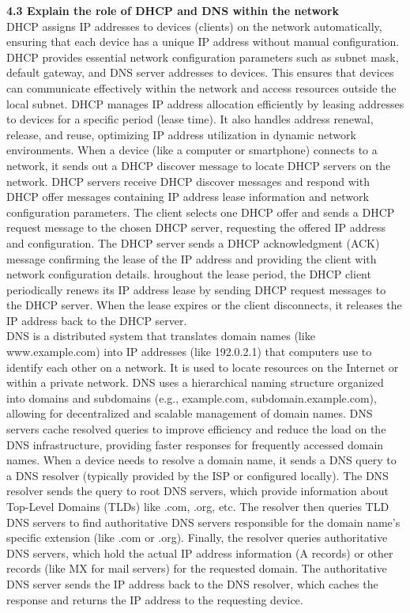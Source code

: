 \documentclass{article}
\begin{document}
\noindent\textbf{4.3 Explain the role of DHCP and DNS within the network}\\

	DHCP assigns IP addresses to devices (clients) on the network automatically, ensuring that each device has a unique IP address without manual configuration. DHCP provides essential network configuration parameters such as subnet mask, default gateway, and DNS server addresses to devices. This ensures that devices can communicate effectively within the network and access resources outside the local subnet. DHCP manages IP address allocation efficiently by leasing addresses to devices for a specific period (lease time). It also handles address renewal, release, and reuse, optimizing IP address utilization in dynamic network environments. When a device (like a computer or smartphone) connects to a network, it sends out a DHCP discover message to locate DHCP servers on the network. DHCP servers receive DHCP discover messages and respond with DHCP offer messages containing IP address lease information and network configuration parameters. The client selects one DHCP offer and sends a DHCP request message to the chosen DHCP server, requesting the offered IP address and configuration. The DHCP server sends a DHCP acknowledgment (ACK) message confirming the lease of the IP address and providing the client with network configuration details. hroughout the lease period, the DHCP client periodically renews its IP address lease by sending DHCP request messages to the DHCP server. When the lease expires or the client disconnects, it releases the IP address back to the DHCP server.\\

	DNS is a distributed system that translates domain names (like www.example.com) into IP addresses (like 192.0.2.1) that computers use to identify each other on a network. It is used to locate resources on the Internet or within a private network. DNS uses a hierarchical naming structure organized into domains and subdomains (e.g., example.com, subdomain.example.com), allowing for decentralized and scalable management of domain names. DNS servers cache resolved queries to improve efficiency and reduce the load on the DNS infrastructure, providing faster responses for frequently accessed domain names. When a device needs to resolve a domain name, it sends a DNS query to a DNS resolver (typically provided by the ISP or configured locally). The DNS resolver sends the query to root DNS servers, which provide information about Top-Level Domains (TLDs) like .com, .org, etc. The resolver then queries TLD DNS servers to find authoritative DNS servers responsible for the domain name's specific extension (like .com or .org). Finally, the resolver queries authoritative DNS servers, which hold the actual IP address information (A records) or other records (like MX for mail servers) for the requested domain. The authoritative DNS server sends the IP address back to the DNS resolver, which caches the response and returns the IP address to the requesting device.\\
  
\end{document}
